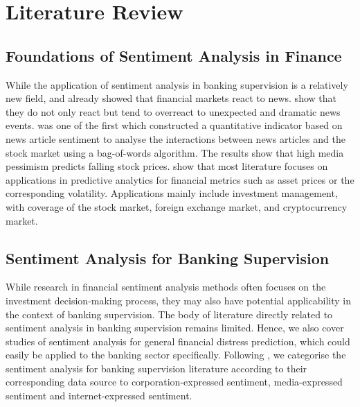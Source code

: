 \chapter{Literature Review}\label{sec3}
\thispagestyle{empty}



\section{Foundations of Sentiment Analysis in Finance}

While the application of sentiment analysis in banking supervision is a relatively new field, \cite{debondt1985} and \cite{cutler1988} already showed that financial markets react to news. \cite{debondt1985} show that they do not only react but tend to overreact to unexpected and dramatic news events. \cite{tetlock2007} was one of the first which constructed a quantitative indicator based on news article sentiment to analyse the interactions between news articles and the stock market using a bag-of-words algorithm. The results show that high media pessimism predicts falling stock prices. \cite{du2024} show that most literature focuses on applications in predictive analytics for financial metrics such as asset prices or the corresponding volatility. Applications mainly include investment management, with coverage of the stock market, foreign exchange market, and cryptocurrency market.

\section{Sentiment Analysis for Banking Supervision}

While research in financial sentiment analysis methods often focuses on the investment decision-making process, they may also have potential applicability in the context of banking supervision. The body of literature directly related to sentiment analysis in banking supervision remains limited. Hence, we also cover studies of sentiment analysis for general financial distress prediction, which could easily be applied to the banking sector specifically. Following \cite{kearney2014}, we categorise the sentiment analysis for banking supervision literature according to their corresponding data source to corporation-expressed sentiment, media-expressed sentiment and internet-expressed sentiment. \\

